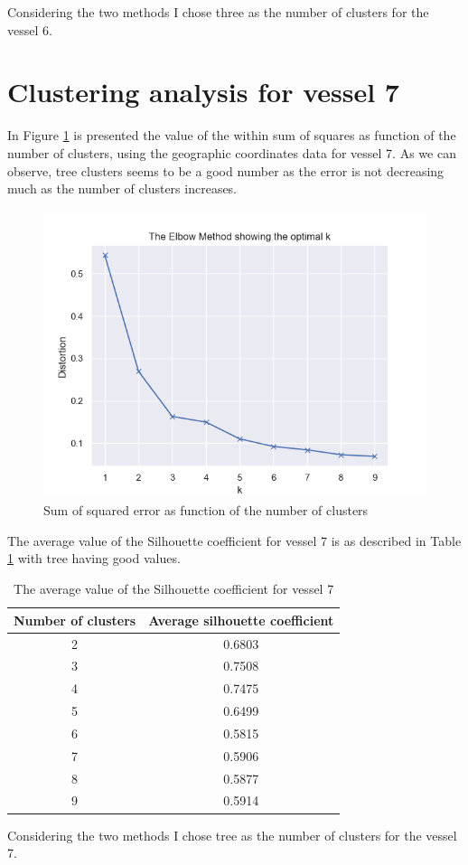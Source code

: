 Considering the two methods I chose three as the number of clusters for the vessel 6.

\section{Clustering analysis for vessel 7} %
\label{sub:clustering_vessel_7}
In Figure \ref{fig:elbow_method_7} is presented the value of the within sum of squares as function of the number of clusters, using the geographic coordinates data for vessel 7. As we can observe, tree clusters seems to be a good number as the error is not decreasing much as the number of clusters increases. 


\begin{figure}[]
\centering
\includegraphics[width=0.8\linewidth]{Chapters/img/elbow_method7.png}
\caption{Sum of squared error as function of the number of clusters}
\label{fig:elbow_method_7}
\end{figure}


The average value of the Silhouette coefficient for vessel 7 is as described in Table \ref{table:vessel7_silhouette} with tree having good values.

\begin {table}[H]
\caption {The average value of the Silhouette coefficient for vessel 7}
\begin{center}
\begin{tabular}{c|c}
\textbf{Number of clusters} & \textbf{Average silhouette coefficient}  \\
\hline
2 & 0.6803 \\
3 & 0.7508 \\
4 & 0.7475 \\
5 & 0.6499 \\
6 & 0.5815 \\
7 & 0.5906 \\
8 & 0.5877 \\
9 & 0.5914 
\label{table:vessel7_silhouette}
\end{tabular}
\end{center}
\end {table}


Considering the two methods I chose tree as the number of clusters for the vessel 7.
